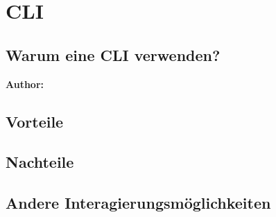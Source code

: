 \chapter{CLI}
\label{cha:Einleitung}



\section{Warum eine CLI verwenden?}

\textbf{Author:} 

\section{Vorteile}


\section{Nachteile}

\section{Andere Interagierungsmöglichkeiten}

